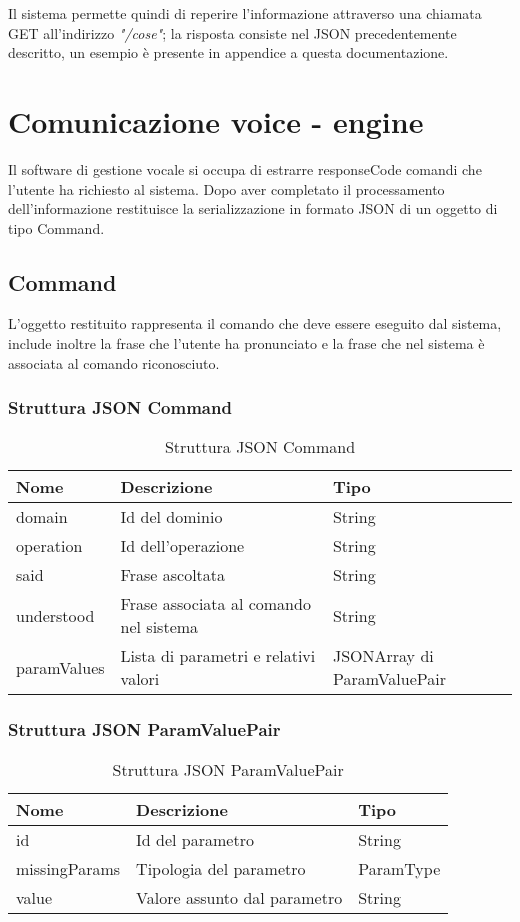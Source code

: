 \documentclass[twoside]{supsistudent}
\begin{document}
Il sistema permette quindi di reperire l'informazione attraverso una chiamata GET all'indirizzo \textit{"/cose"}; la risposta consiste nel JSON precedentemente descritto, un esempio è presente in appendice a questa documentazione.
\chapter{Comunicazione voice - engine }
Il software di gestione vocale si occupa di estrarre responseCode comandi che l'utente ha richiesto al sistema. Dopo aver completato il processamento dell'informazione restituisce la serializzazione in formato JSON di un oggetto di tipo Command.
\section{Command}
L'oggetto restituito rappresenta il comando che deve essere eseguito dal sistema, include inoltre la frase che l'utente ha pronunciato e la frase che nel sistema è associata al comando riconosciuto.
\subsection{Struttura JSON Command}
\begin{table}[H]
\centering
\caption{Struttura JSON Command}
\label{Struttura JSON Command}
\begin{tabular}{|l|l|l|}
\hline
Nome            & Descrizione                            & Tipo                        \\ \hline
domain          & Id del dominio                         & String                      \\ \hline
operation       & Id dell'operazione                     & String                      \\ \hline
said            & Frase ascoltata                        & String                      \\ \hline
understood      & Frase associata al comando nel sistema & String                      \\ \hline
paramValues & Lista di parametri e relativi valori   & JSONArray di ParamValuePair \\ \hline
\end{tabular}
\end{table}
\subsection{Struttura JSON ParamValuePair}
\begin{table}[H]
\centering
\caption{Struttura JSON ParamValuePair}
\label{Struttura JSON ParamValuePair}
\begin{tabular}{|l|l|l|}
\hline
Nome  & Descrizione                  & Tipo      \\ \hline
id    & Id del parametro             & String    \\ \hline
missingParams  & Tipologia del parametro      & ParamType \\ \hline
value & Valore assunto dal parametro & String    \\ \hline
\end{tabular}
\end{table}
\end{document}
